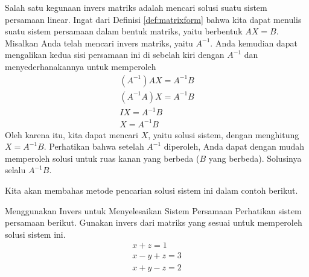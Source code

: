 Salah satu kegunaan invers matriks adalah mencari solusi suatu sistem persamaan linear.
Ingat dari Definisi \ref{def:matrixform} bahwa kita dapat menulis suatu sistem persamaan dalam bentuk matriks,
yaitu berbentuk $AX=B$. Misalkan Anda telah mencari
invers matriks, yaitu $A^{-1}$. Anda kemudian dapat mengalikan kedua sisi
persamaan ini di sebelah kiri dengan $A^{-1}$ dan menyederhanakannya untuk memperoleh
\begin{equation*}
\begin{array}{c}
\left( A^{-1} \right) AX =A^{-1}B \\
\left(A^{-1}A\right) X = A^{-1}B \\
IX = A^{-1}B \\
X = A^{-1}B
\end{array}
\end{equation*}
Oleh karena itu, kita dapat mencari $X$, yaitu solusi sistem, dengan menghitung $X=A^{-1}B$.
Perhatikan bahwa setelah
$A^{-1}$ diperoleh, Anda dapat dengan mudah memperoleh solusi untuk ruas kanan yang berbeda
($B$ yang berbeda). Solusinya selalu $A^{-1}B$.
 
Kita akan membahas metode pencarian solusi sistem ini dalam contoh berikut. 

\begin{example}{Menggunakan Invers untuk Menyelesaikan Sistem Persamaan}\label{exa:inversetosolvesystem}
 Perhatikan sistem
persamaan berikut. Gunakan invers dari matriks yang sesuai untuk memperoleh solusi
sistem ini.
\begin{equation*}
\begin{array}{c}
x+z=1 \\
x-y+z=3 \\
x+y-z=2
\end{array}
\end{equation*}
\end{example}

